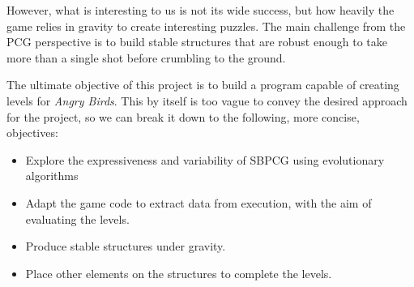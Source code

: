 However, what is interesting to us is not its wide success, but how heavily the game relies in gravity to create interesting puzzles. The main challenge from the PCG perspective is to build stable structures that are robust enough to take more than a single shot before crumbling to the ground.

 

The ultimate objective of this project is to build a program capable of creating levels for \textit{Angry Birds}. This by itself is too vague to convey the desired approach for the project, so we can break it down to the following, more concise, objectives:

\begin{itemize}
	\item Explore the expressiveness and variability of SBPCG using evolutionary algorithms
	\item Adapt the game code to extract data from execution, with the aim of evaluating the levels.
	\item Produce stable structures under gravity.
	\item Place other elements on the structures to complete the levels.
\end{itemize} 


